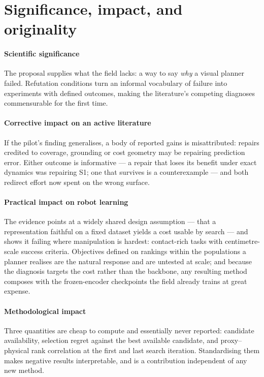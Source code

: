 \documentclass[11pt,letterpaper]{article}
\begin{document}
\section{Significance, impact, and originality}

\paragraph{Scientific significance} The proposal supplies what the field lacks:
a way to say \emph{why} a visual planner failed. Refutation conditions turn an
informal vocabulary of failure into experiments with defined outcomes, making
the literature's competing diagnoses commensurable for the first time.

\paragraph{Corrective impact on an active literature} If the pilot's finding
generalises, a body of reported gains is misattributed: repairs credited to
coverage, grounding or cost geometry may be repairing prediction error. Either
outcome is informative --- a repair that loses its benefit under exact dynamics
was repairing S1; one that survives is a counterexample --- and both redirect
effort now spent on the wrong surface.

\paragraph{Practical impact on robot learning} The evidence points at a widely
shared design assumption --- that a representation faithful on a fixed dataset
yields a cost usable by search --- and shows it failing where manipulation is
hardest: contact-rich tasks with centimetre-scale success criteria. Objectives
defined on rankings within the populations a planner realises are the natural
response and are untested at scale; and because the diagnosis targets the cost
rather than the backbone, any resulting method composes with the frozen-encoder
checkpoints the field already trains at great expense.

\paragraph{Methodological impact} Three quantities are cheap to compute and
essentially never reported: candidate availability, selection regret against the
best available candidate, and proxy--physical rank correlation at the first and
last search iteration. Standardising them makes negative results interpretable,
and is a contribution independent of any new method.
\end{document}
